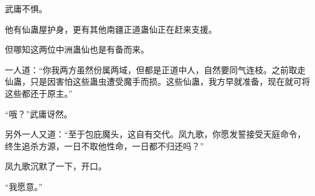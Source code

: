 \begin{this_body}
武庸不惧。

他有仙蛊屋护身，更有其他南疆正道蛊仙正在赶来支援。

但哪知这两位中洲蛊仙也是有备而来。

一人道：“你我两方虽然份属两域，但都是正道中人，自然要同气连枝。之前取走仙蛊，只是因害怕这些蛊虫遭受魔手而损。这些仙蛊，我方早就准备，现在就可将这些都还于原主。”

“哦？”武庸讶然。

另外一人又道：“至于包庇魔头，这自有交代。凤九歌，你愿发誓接受天庭命令，终生追杀方源，一日不取他性命，一日都不归还吗？”

凤九歌沉默了一下，开口。

“我愿意。”

\end{this_body}

